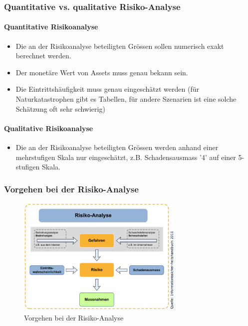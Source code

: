 \documentclass[10pt,a4paper]{article}
\begin{document}
\subsubsection*{Quantitative vs. qualitative Risiko-Analyse}
\paragraph*{Quantitative Risikoanalyse}
\begin{itemize}[noitemsep,topsep=0pt,leftmargin=*]
    \item Die an der Risikoanalyse beteiligten Grössen sollen numerisch exakt berechnet werden.
    \item Der monetäre Wert von Assets muss genau bekann sein.
    \item Die Eintrittshäufigkeit muss genau eingeschätzt werden (für Naturkatastrophen gibt es Tabellen, für andere Szenarien ist eine solche Schätzung oft sehr schwierig)
\end{itemize}

\paragraph*{Qualitative Risikoanalyse}
\begin{itemize}[noitemsep,topsep=0pt,leftmargin=*]
    \item Die an der Risikoanalyse beteiligten Grössen werden anhand einer mehrstufigen Skala nur eingeschätzt, z.B. Schadensausmass '4' auf einer 5-stufigen Skala.
\end{itemize}

\subsubsection*{Vorgehen bei der Risiko-Analyse}
\begin{figure}[H]
    \begin{center}
    \includegraphics[width=8cm]{images/Risikoanalyse_Vorgehen.png}
    \caption{Vorgehen bei der Risiko-Analyse}
    \label{Risiko-Analyse Vorgehen}
    \end{center}
\end{figure}
\end{document}
